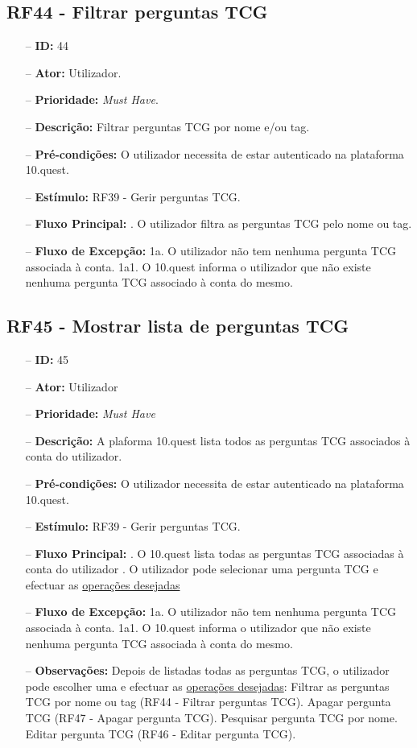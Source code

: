 \subsection{RF44 - Filtrar perguntas TCG}
\begin{itemize}
	\item[--] \textbf{ID:} 44
	\item[--]  \textbf{Ator:} Utilizador.
	\item[--]  \textbf{Prioridade:} \textit{Must Have}.
	\item[--]  \textbf{Descrição:} Filtrar perguntas TCG por nome e/ou tag.
	\item[--]  \textbf{Pré-condições:} O utilizador necessita de estar autenticado na plataforma 10.quest.
	\item[--]  \textbf{Estímulo:} RF39 - Gerir perguntas TCG.
	\item[--]  \textbf{Fluxo Principal:} 
	. O utilizador filtra as perguntas TCG pelo nome ou tag.
	\item[--]  \textbf{Fluxo de Excepção:} 
	\subitem 1a. O utilizador não tem nenhuma pergunta TCG associada à conta.
	\subitem 1a1. O 10.quest informa o utilizador que não existe nenhuma pergunta TCG  associado à conta do mesmo.
\end{itemize}
\newpage

\subsection{RF45 - Mostrar lista de perguntas TCG}
\begin{itemize}
	\item[--] \textbf{ID:} 45
	\item[--]  \textbf{Ator:} Utilizador
	\item[--]  \textbf{Prioridade:} \textit{Must Have}
	\item[--]  \textbf{Descrição:} A plaforma 10.quest lista todos as perguntas TCG  associados à conta do utilizador.
	\item[--]  \textbf{Pré-condições:} O utilizador necessita de estar autenticado na plataforma 10.quest.
	\item[--]  \textbf{Estímulo:} RF39 - Gerir perguntas TCG.
	\item[--]  \textbf{Fluxo Principal:} 
	. O 10.quest lista todas as perguntas TCG associadas à conta do utilizador
	. O utilizador pode selecionar uma pergunta TCG e efectuar as \underline{operações desejadas}
	\item[--]  \textbf{Fluxo de Excepção:} 
	\subitem 1a. O utilizador não tem nenhuma pergunta TCG associada à conta.
	\subitem 1a1. O 10.quest informa o utilizador que não existe nenhuma pergunta TCG associada à conta do mesmo.
	\item[--]  \textbf{Observações:} Depois de listadas todas as perguntas TCG, o utilizador pode escolher uma e efectuar as \underline{operações desejadas}:
	\subitem Filtrar as perguntas TCG por nome ou tag (RF44 - Filtrar perguntas TCG).
	\subitem Apagar pergunta TCG (RF47 - Apagar pergunta TCG).
	\subitem Pesquisar pergunta TCG por nome.
	\subitem Editar pergunta TCG (RF46 - Editar pergunta TCG).
\end{itemize}
\newpage

